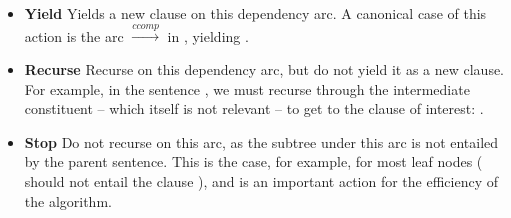 \begin{itemize}[leftmargin=2ex]
\item[] \textbf{Yield} \hspace{1ex}
  Yields a new clause on this dependency arc.
  A canonical case of this action is the arc 
     $\xrightarrow{ccomp}$  in
    , yielding
    .

\item[] \textbf{Recurse} \hspace{1ex}
  Recurse on this dependency arc, but do not yield it as a new clause.
  For example, in the sentence , we must recurse through the intermediate constituent
   -- which itself is not relevant
  -- to get to the clause of interest: .

\item[] \textbf{Stop}  \hspace{1ex}
  Do not recurse on this arc, as the subtree under this arc is
    not entailed by the parent sentence.
  This is the case, for example, for most leaf nodes
    ( should not entail the clause ),
    and is an important action for the efficiency of the algorithm.
\end{itemize}

